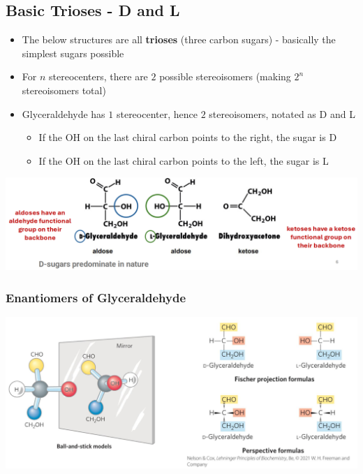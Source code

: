 \documentclass[10pt]{article}
\begin{document}
\subsection*{Basic Trioses - D and L}
\begin{itemize}
    \item The below structures are all \textbf{trioses} (three carbon sugars) - basically the simplest sugars possible
    \item For $n$ stereocenters, there are $2$ possible stereoisomers (making $2^n$ stereoisomers total)
    \item Glyceraldehyde has $1$ stereocenter, hence $2$ stereoisomers, notated as D and L
    \begin{itemize}
        \item If the OH on the last chiral carbon points to the right, the sugar is D
        \item If the OH on the last chiral carbon points to the left, the sugar is L
    \end{itemize}
\end{itemize}
\begin{center}
    \includegraphics*[width=\textwidth]{L1_2.png}
\end{center}

\subsubsection*{Enantiomers of Glyceraldehyde}
\begin{center}
    \includegraphics*[width=\textwidth]{L1_3.png}
\end{center}
\end{document}
